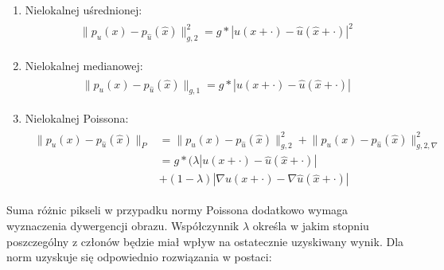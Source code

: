 \documentclass[12pt, twoside, openany]{report}
\theoremstyle{definition}
\begin{document}
\begin{enumerate}
\item
Nielokalnej uśrednionej:
\begin{align}
\begin{aligned}
\big\| p_{u}(x) - p_{\hat{u}}(\hat{x}) \big\|^{2}_{g,2} = g \ast | u(x+\cdot) - \hat{u}(\hat{x}+\cdot) |^2
\label{nonLocalMeans}
\end{aligned}
\end{align}
\item
Nielokalnej medianowej:
\begin{align}
\begin{aligned}
\big\| p_{u}(x) - p_{\hat{u}}(\hat{x}) \big\|_{g,1} = g \ast | u(x+\cdot) - \hat{u}(\hat{x}+\cdot) |
\label{nonLocalMedians}
\end{aligned}
\end{align}
\item
Nielokalnej Poissona:
\begin{align}
\begin{aligned}
\big\| p_{u}(x) - p_{\hat{u}}(\hat{x}) \big\|_{P} &= \big\| p_{u}(x) - p_{\hat{u}}(\hat{x}) \big\|^{2}_{g,2} + \big\| p_{u}(x) - p_{\hat{u}}(\hat{x}) \big\|^{2}_{g,2,\nabla} \\
&= g \ast (\lambda | u(x+\cdot) - \hat{u}(\hat{x}+\cdot) | \\
&+ (1-\lambda)|\nabla u(x+\cdot) - \nabla \hat{u}(\hat{x}+\cdot)|
\label{nonLocalpoisson}
\end{aligned}
\end{align}
\end{enumerate}
Suma różnic pikseli w przypadku normy Poissona dodatkowo wymaga wyznaczenia dywergencji obrazu. Współczynnik $\lambda$ określa w jakim stopniu poszczególny z członów będzie miał wpływ na ostatecznie uzyskiwany wynik. Dla norm uzyskuje się odpowiednio rozwiązania w postaci:
\end{document}
